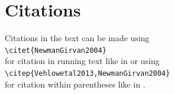 \documentclass[times,authoryear]{elsarticle}
\begin{document}






\section{Citations}

Citations in the text can be made using\\[6pt]
\verb+\citet{NewmanGirvan2004}+\\[6pt]
for citation in running text like in
\citet{NewmanGirvan2004} or using\\[6pt]
\verb+\citep{Vehlowetal2013,NewmanGirvan2004}+\\[6pt]
for citation within parentheses like in
\citep{Vehlowetal2013,NewmanGirvan2004}.
\end{document}
